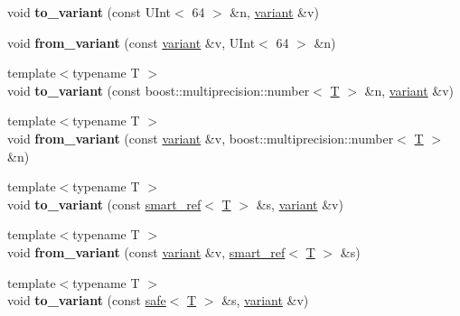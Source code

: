 \begin{DoxyCompactItemize}
\item 
\mbox{\label{namespacefc_a7ad6ed60a0ba1c23be1f299d13e63314}} 
void {\bfseries to\+\_\+variant} (const U\+Int$<$ 64 $>$ \&n, \mbox{\hyperlink{classfc_1_1variant}{variant}} \&v)
\item 
\mbox{\label{namespacefc_ab5bb1d516e1fea97d75c206dffc38d72}} 
void {\bfseries from\+\_\+variant} (const \mbox{\hyperlink{classfc_1_1variant}{variant}} \&v, U\+Int$<$ 64 $>$ \&n)
\item 
\mbox{\label{namespacefc_a49b9a1c6eb52be7274f7e4cfa76eac57}} 
{\footnotesize template$<$typename T $>$ }\\void {\bfseries to\+\_\+variant} (const boost\+::multiprecision\+::number$<$ \mbox{\hyperlink{struct_t}{T}} $>$ \&n, \mbox{\hyperlink{classfc_1_1variant}{variant}} \&v)
\item 
\mbox{\label{namespacefc_a07aa009863c282bd5bd8ed750fbc689a}} 
{\footnotesize template$<$typename T $>$ }\\void {\bfseries from\+\_\+variant} (const \mbox{\hyperlink{classfc_1_1variant}{variant}} \&v, boost\+::multiprecision\+::number$<$ \mbox{\hyperlink{struct_t}{T}} $>$ \&n)
\item 
\mbox{\label{namespacefc_a9060454ab2ba37533ad182a2ff809cee}} 
{\footnotesize template$<$typename T $>$ }\\void {\bfseries to\+\_\+variant} (const \mbox{\hyperlink{classfc_1_1smart__ref}{smart\+\_\+ref}}$<$ \mbox{\hyperlink{struct_t}{T}} $>$ \&s, \mbox{\hyperlink{classfc_1_1variant}{variant}} \&v)
\item 
\mbox{\label{namespacefc_a57b1dd5c1f08ae00306333453492da2f}} 
{\footnotesize template$<$typename T $>$ }\\void {\bfseries from\+\_\+variant} (const \mbox{\hyperlink{classfc_1_1variant}{variant}} \&v, \mbox{\hyperlink{classfc_1_1smart__ref}{smart\+\_\+ref}}$<$ \mbox{\hyperlink{struct_t}{T}} $>$ \&s)
\item 
\mbox{\label{namespacefc_a608c914328f60a9dc40cb8e9a464ed44}} 
{\footnotesize template$<$typename T $>$ }\\void {\bfseries to\+\_\+variant} (const \mbox{\hyperlink{structfc_1_1safe}{safe}}$<$ \mbox{\hyperlink{struct_t}{T}} $>$ \&s, \mbox{\hyperlink{classfc_1_1variant}{variant}} \&v)

\end{DoxyCompactItemize}
